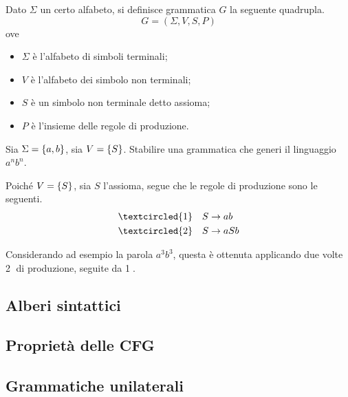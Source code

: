 \documentclass{subfiles}
\begin{document}
\begin{Definition*}
    Dato \(\Sigma\) un certo alfabeto, si definisce grammatica \(G\) la seguente quadrupla.
    \[
        G = (\Sigma, V, S, P)
    \]
    ove
    \begin{itemize}
        \item \(\Sigma\) è l'alfabeto di simboli terminali;
        \item \(V\) è l'alfabeto dei simbolo non terminali;
        \item \(S\) è un simbolo non terminale detto assioma;
        \item \(P\) è l'insieme delle regole di produzione.
    \end{itemize}
\end{Definition*}
\begin{Example*}
    Sia \(\Sigma = \left\{a, b\right\}\), sia \(V = \left\{S\right\}\). Stabilire una grammatica che generi il linguaggio \(a^{n}b^{n}\).
    \begin{Solution*}
        Poiché \(V = \left\{S\right\}\), sia \(S\) l'assioma, segue che le regole di produzione sono le seguenti.
        \[\begin{aligned}
                \textcircled{1} & \quad S \to ab  \\
                \textcircled{2} & \quad S \to aSb \\
            \end{aligned}\]

        \noindent Considerando ad esempio la parola \(a^{3}b^{3}\), questa è ottenuta applicando due volte \textcircled{2} di produzione, seguite da \textcircled{1}.
    \end{Solution*}
\end{Example*}

\subsection{Alberi sintattici}


\subsection{Proprietà delle CFG}


\subsection{Grammatiche unilaterali}

\end{document}
